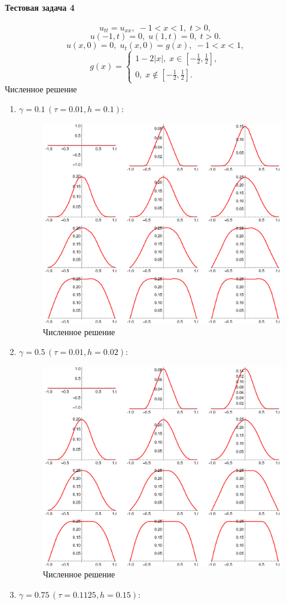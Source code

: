 \documentclass[12pt, a4paper]{article}
\begin{document}
	\paragraph{Тестовая задача 4}
\[
u_{tt}=u_{xx},\;-1<x<1,\;t>0,
\]
\[
u(-1,t)=0,\;u(1,t)=0,\;t>0.
\]
\[
u(x,0)=0,\; u_t(x,0)=g(x),\;-1<x<1,
\]
\[
g(x)=
\begin{cases}
	1-2|x|,\;x\in[-\frac12,\frac12],\\
	0,\;x\notin[-\frac12,\frac12].
\end{cases}
\]
Численное решение
\begin{enumerate}
	\item $\gamma =0.1\,(\tau = 0.01 ,h =0.1)$:
	\begin{figure}[H]
		\centering
		\includegraphics[width=0.5\linewidth]{task2_0.1}
		\caption{Численное решение}
	\end{figure}
	\item $\gamma =0.5\,(\tau = 0.01 ,h =0.02)$:
	\begin{figure}[H]
		\centering
		\includegraphics[width=0.7\linewidth]{task2_0.5}
		\caption{Численное решение}
	\end{figure}
	\item $\gamma =0.75\,(\tau = 0.1125 ,h =0.15)$:
	\begin{figure}[H]

\end{figure}
\end{enumerate}
\end{document}
